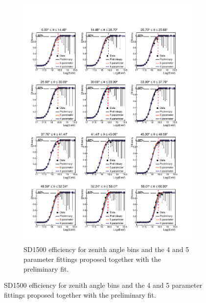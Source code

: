 \documentclass[12pt,a4paper]{article}
\begin{document}
\begin{figure}[]
\begin{figure}[]
    \center
    \includegraphics[height=0.95\textheight]{plots/EfficiencyZenith.pdf}
    \caption{SD1500 efficiency for zenith angle bins and the 4 and 5 parameter fittings proposed together with the preliminary fit.
    \label{fig:zenith}}
\end{figure}




\end{figure}
\end{document}
